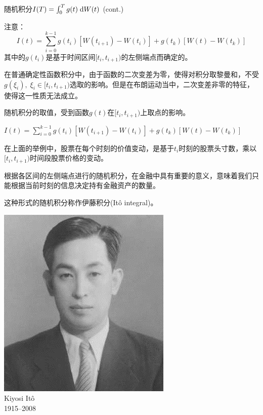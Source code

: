 \documentclass[t]{beamer}
\newcommand{\dif}{{\;\rm d}}
\begin{document}
\begin{frame}{随机积分$I(T)=\int^T_0 g(t)\dif W(t)$ (cont.)}
\begin{block}{注意：}
\begin{equation*}
I(t)=\sum^{k-1}_{i=0}g(t_i)[W(t_{i+1})-W(t_{i})]+g(t_k)[W(t)-W(t_k)]
\end{equation*}
其中的$g(t_i)$是基于时间区间$[t_i,t_{i+1})$的{\color{red}左侧端点}而确定的。
\end{block}

在普通确定性函数积分中，由于函数的二次变差为零，使得对积分取黎曼和，不受$g(\xi_i),\; \xi_i\in[t_i,t_{i+1})$选取的影响。但是在布朗运动当中，二次变差非零的特征，使得这一性质无法成立。

{\color{red}随机积分的取值，受到函数$g(t)$在$[t_i,t_{i+1})$上取点的影响。}

\end{frame}

\begin{frame}{$I(t)=\sum^{k-1}_{i=0}g(t_i)[W(t_{i+1})-W(t_{i})]+g(t_k)[W(t)-W(t_k)]$}

\begin{multicols}{2}
在上面的举例中，股票在每个时刻的价值变动，是基于$t_i$时刻的股票头寸数，乘以$[t_i,t_{i+1})$时间段股票价格的变动。

根据各区间的{\color{red}左侧端点}进行的随机积分，在金融中具有重要的意义，意味着我们只能根据当前时刻的信息决定持有金融资产的数量。

这种形式的随机积分称作伊藤积分(It\^{o} integral)。

\begin{center}
\includegraphics[scale=0.3]{fig/ito.jpg}\\
Kiyosi It\^{o} \\
1915--2008
\end{center}
\end{multicols}
\end{frame}
\end{document}
